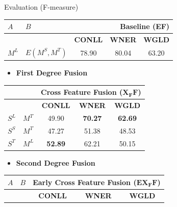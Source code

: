 \documentclass[10pt,=table]{beamer}
\newcommand\mlex{M^{\scriptscriptstyle L}}
\newcommand\mstd{M^{\scriptscriptstyle T}}
\newcommand\slex{S^{\scriptscriptstyle L}}
\newcommand\ssyn{S^{\scriptscriptstyle S}}
\newcommand\sstd{S^{\scriptscriptstyle T}}
\begin{document}
\begin{frame}{Evaluation (F-measure)}
\begin{minipage}[c][.3\textheight][c]{\linewidth}
\centering
	\begin{tabular}{@{}llccc@{}}
			\toprule
    $A$      &    $B$       & \multicolumn{3}{r}{\textbf{Baseline (EF)} }                                            \\ \midrule
          &           & \textbf{CONLL}                      & \textbf{WNER}                      & \textbf{WGLD}                      \\ \cmidrule{3-5}
          	\rowcolor{orangeEric}
			${\mlex}$ & ${E(M^S, M^T)}$ & {78.90}                      & {80.04}                     & {63.20}                   \\ \bottomrule
	\end{tabular}
\end{minipage}

\begin{overprint}
		\begin{itemize}
		\item[] \large \textbf{First Degree Fusion}
		\end{itemize}
		\begin{minipage}[c][.4\textheight][c]{\linewidth}
		\centering
		\begin{tabular}{@{}llccc@{}}
		\toprule
			          &           & \multicolumn{3}{r}{\textbf{Cross Feature Fusion ($\mathbf{X_FF}$)}} \\
			\midrule
			          &           & \textbf{CONLL}                      & \textbf{WNER}                      & \textbf{WGLD}                      \\ \cmidrule{3-5}
			$\slex$ &$\mstd$        & 49.90                      & \textbf{70.27}                     & \textbf{62.69}                    \\
			$\ssyn$ & $\mstd$ & 47.27                      & 51.38                     & 48.53                     \\
			$\sstd$ & $\mlex$        & \textbf{52.89}                      & 62.21                     & 50.15                     \\
			\bottomrule
		\end{tabular}
		\end{minipage}
		\begin{itemize}
			\item[] \large \textbf{Second Degree Fusion}
		\end{itemize}
		\begin{minipage}[c][.4\textheight][c]{\linewidth}
		\centering
		\begin{tabular}{@{}llccc@{}}
		\toprule
		$A$&$B$& \multicolumn{3}{r}{\textbf{Early Cross Feature Fusion ($\mathbf{EX_FF}$)}} \\ \midrule
			                         &                & \textbf{CONLL} & \textbf{WNER}  &             \textbf{WGLD}             \\
			\cmidrule{3-5}
		

\end{tabular}
\end{minipage}
\end{overprint}
\end{frame}
\end{document}

